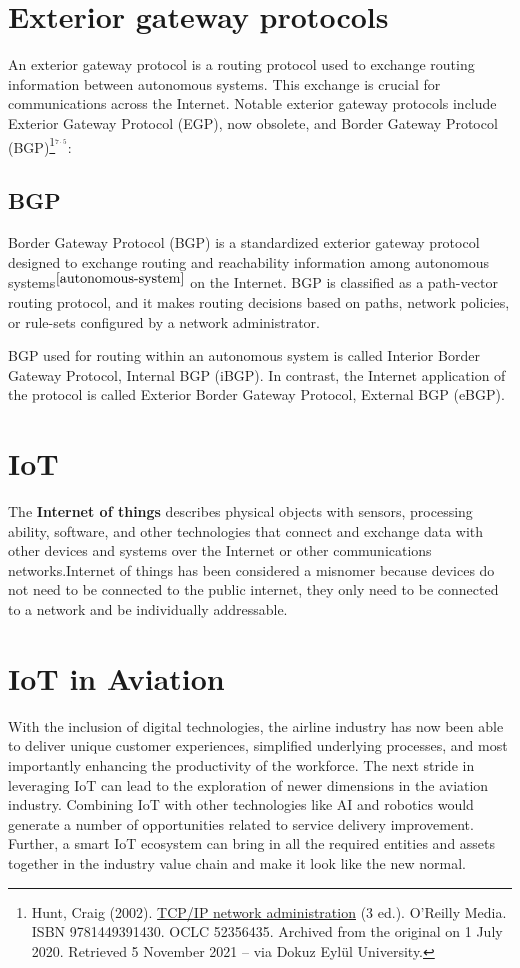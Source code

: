 \documentclass[a4paper,12pt]{book}
\begin{document}
\section{Exterior gateway protocols}

An exterior gateway protocol is a routing protocol used to exchange routing information between autonomous systems. This exchange is crucial for communications across the Internet. Notable exterior gateway protocols include Exterior Gateway Protocol (EGP), now obsolete, and Border Gateway Protocol (BGP)\footnote{\label{EGP}  Hunt, Craig (2002). \href{http://web.deu.edu.tr/doc/oreily/networking/tcpip/index.htm}{TCP/IP network administration} (3 ed.). O'Reilly Media. ISBN 9781449391430. OCLC 52356435. Archived from the original on 1 July 2020. Retrieved 5 November 2021 – via Dokuz Eylül University.}${}^{{}^{7 \cdot 5}}$:  

\subsection{BGP}
Border Gateway Protocol (BGP) is a standardized exterior gateway protocol designed to exchange routing and reachability information among autonomous systems$ ^{\ref{autonomous-system}}$ on the Internet. BGP is classified as a path-vector routing protocol, and it makes routing decisions based on paths, network policies, or rule-sets configured by a network administrator.

BGP used for routing within an autonomous system is called Interior Border Gateway Protocol, Internal BGP (iBGP). In contrast, the Internet application of the protocol is called Exterior Border Gateway Protocol, External BGP (eBGP).

\section{IoT}
The \textbf{Internet of things} describes physical objects with sensors, processing ability, software, and other technologies that connect and exchange data with other devices and systems over the Internet or other communications networks.Internet of things has been considered a misnomer because devices do not need to be connected to the public internet, they only need to be connected to a network and be individually addressable.

\section{IoT in Aviation}
With the inclusion of digital technologies, the airline industry has now been able to deliver unique customer experiences, simplified underlying processes, and most importantly enhancing the productivity of the workforce. The next stride in leveraging IoT can lead to the exploration of newer dimensions in the aviation industry. Combining IoT with other technologies like AI and robotics would generate a number of opportunities related to service delivery improvement. Further, a smart  IoT ecosystem can bring in all the required entities and assets together in the industry value chain and make it look like the new normal.
\end{document}
